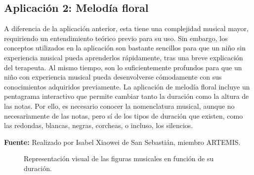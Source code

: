 \subsection{Aplicación 2: Melodía floral}

A diferencia de la aplicación anterior, esta tiene una complejidad musical mayor, requiriendo un entendimiento teórico previo para su uso. Sin embargo, los conceptos utilizados en la aplicación son bastante sencillos para que un niño sin experiencia musical pueda aprenderlos rápidamente, tras una breve explicación del terapeuta. Al mismo tiempo, son lo suficientemente profundos para que un niño con experiencia musical pueda desenvolverse cómodamente con sus conocimientos adquiridos previamente. La aplicación de melodía floral incluye un pentagrama interactivo que permite cambiar tanto la duración como la altura de las notas. Por ello, es necesario conocer la nomenclatura musical, aunque no necesariamente de las notas, pero sí de los tipos de duración que existen, como las redondas, blancas, negras, corcheas, o incluso, los silencios.

\begin{center}
	\textbf{Fuente:} Realizado por Isabel Xiaowei de San Sebastián, miembro ARTEMIS.
	\vspace{-18pt}
\end{center}

\begin{figure}[h!]
	\centering
	\caption{Representación visual de las figuras musicales en función de su duración.}
	\label{fig:FloralMelodyNotes}
\end{figure}


